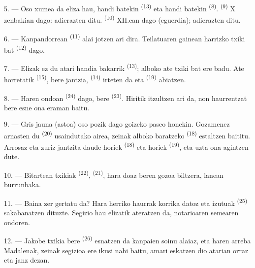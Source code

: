\VUsaut{3.4mm}
\VUsaut{3.0mm}

5. --- Oso xumea da eliza hau,  handi batekin \textsuperscript{(13)}
eta  handi batekin \textsuperscript{(8)}. 
\textsuperscript{(9)} X zenbakian dago:  adierazten ditu.
 \textsuperscript{(10)} XII.ean dago (eguerdia);
 adierazten ditu.

6. --- Kanpandorrean  \textsuperscript{(11)} alai jotzen ari
dira. Teilatuaren gainean harrizko  txiki bat
\textsuperscript{(12)} dago.

7. --- Elizak ez du atari handia bakarrik \textsuperscript{(13)}; alboko ate txiki
bat ere badu. Ate horretatik  \textsuperscript{(15)}, bere
 jantzia,  \textsuperscript{(14)} irteten da
eta  \textsuperscript{(19)} abiatzen.

8. --- Haren ondoan  \textsuperscript{(24)} dago, bere
 \textsuperscript{(23)}. Hiritik itzultzen ari da, non
haurrentzat bere esne ona eraman baitu.

\VUsaut{4.0mm}
\VUsaut{3.4mm}

9. --- Gris jauna (astoa) oso pozik dago goizeko paseo honekin. Gozamenez
arnasten du  \textsuperscript{(20)} usaindutako airea, zeinak
alboko baratzeko  \textsuperscript{(18)} estaltzen
baititu. Arrosaz eta zuriz jantzita daude  horiek
\textsuperscript{(18)} eta  horiek \textsuperscript{(19)},
eta uzta ona agintzen dute.

10. --- Bitartean  txikiak \textsuperscript{(22)},
 \textsuperscript{(21)}, hara doaz beren 
gozoa biltzera, lanean burrunbaka.

11. --- Baina zer gertatu da? Hara herriko haurrak korrika datoz eta
 izutuak \textsuperscript{(25)} sakabanatzen dituzte. Segizio hau
elizatik ateratzen da, notarioaren semearen  ondoren.

12. --- Jakobe txikia bere  \textsuperscript{(26)} esnatzen da
kanpaien soinu alaiaz, eta haren arreba Madalenak, zeinak segizioa ere ikusi nahi
baitu, amari eskatzen dio atarian orraz eta janz dezan.

